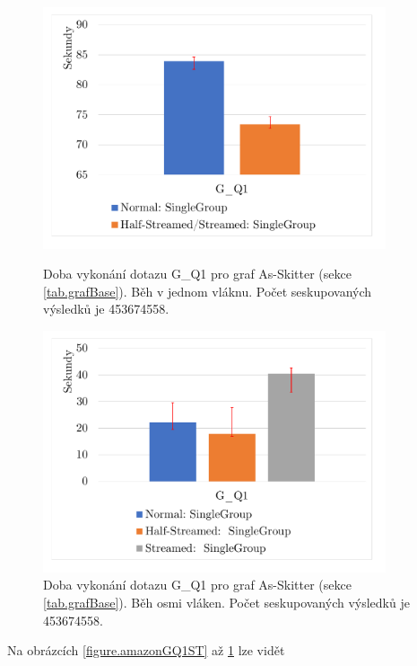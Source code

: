 \clearpage

\begin{figure}[!htp]
    \centering
    \begin{minipage}{0.45\textwidth}
        \centering
        \includegraphics[width=0.9\textwidth]{../img/skitterGroupByQ1ST.pdf} %
        \caption{Doba vykonání dotazu G\_Q1 pro graf As-Skitter (sekce \ref{tab.grafBase}). Běh v jednom vláknu. Počet seskupovaných výsledků je 453674558.}
        \label{figure.skitterGQ1ST}
    \end{minipage}\hfill
    \begin{minipage}{0.45\textwidth}
        \centering
        \includegraphics[width=0.9\textwidth]{../img/skitterGroupByQ1Par.pdf} %
        \caption{Doba vykonání dotazu G\_Q1 pro graf As-Skitter (sekce \ref{tab.grafBase}). Běh osmi vláken. Počet seskupovaných výsledků je 453674558.}
        \label{figure.skitterGQ1Par}
    \end{minipage}
\end{figure}

Na obrázcích \ref{figure.amazonGQ1ST} až \ref{figure.skitterGQ1Par} lze vidět